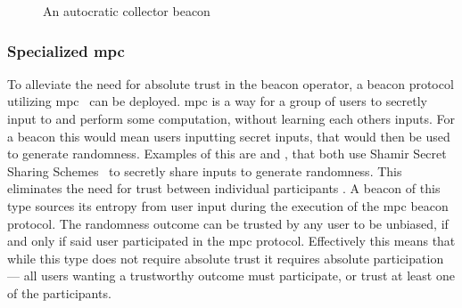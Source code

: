 \begin{figure}[htb]
    \centering
    \footnotesize
    \caption{An autocratic collector beacon}\label{fig:autocratic_beacon}
\end{figure}


\subsubsection{Specialized \gls{mpc}}\label{ssub:specialized_mpc}
To alleviate the need for absolute trust in the beacon operator, a beacon protocol utilizing \acrfull{mpc}~\cite{goldreich1998secure} can be deployed. \gls{mpc} is a way for a group of users to secretly input to and perform some computation, without learning each others inputs.
For a beacon this would mean users inputting secret inputs, that would then be used to generate randomness.
Examples of this are  and , that both use Shamir Secret Sharing Schemes~\cite{shamir1979} to secretly share inputs to generate randomness.
This eliminates the need for trust between individual participants .
A beacon of this type sources its entropy from user input during the execution of the \gls{mpc} beacon protocol.
The randomness outcome can be trusted by any user to be unbiased, if and only if said user participated in the \gls{mpc} protocol.
Effectively this means that while this type does not require absolute trust it requires absolute participation --- all users wanting a trustworthy outcome must participate, or trust at least one of the participants.


